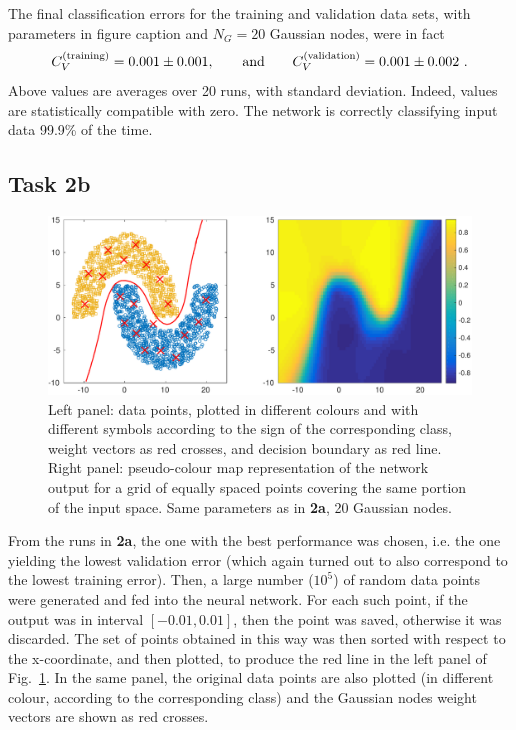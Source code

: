 \documentclass[12pt,titlepage]{article}
\begin{document}
The final classification errors for the training and validation data sets, with parameters in figure caption and $N_G = 20$ Gaussian nodes, were in fact
\[
C_V^{(\textup{training})} = 0.001 \pm 0.001 , \qquad \mbox{and} \qquad C_V^{(\textup{validation})} = 0.001 \pm 0.002 \ .
\]
Above values are averages over 20 runs, with standard deviation. Indeed, values are statistically compatible with zero. The network is correctly classifying input data 99.9\% of the time.


\clearpage
\subsection*{Task 2b}

\begin{figure}[htbp]
\centering
\includegraphics[width=\textwidth]{2b_boundary.pdf}
\caption{Left panel: data points, plotted in different colours and with different symbols according to the sign of the corresponding class, weight vectors as red crosses, and decision boundary as red line. Right panel: pseudo-colour map representation of the network output for a grid of equally spaced points covering the same portion of the input space. Same parameters as in \textbf{2a}, 20 Gaussian nodes.}
\label{fig:2b_boundary}
\end{figure}

From the runs in \textbf{2a}, the one with the best performance was chosen, i.e. the one yielding the lowest validation error (which again turned out to also correspond to the lowest training error).
Then, a large number ($10^5$) of random data points were generated and fed into the neural network. For each such point, if the output was in interval $[-0.01, 0.01]$, then the point was saved, otherwise it was discarded. The set of points obtained in this way was then sorted with respect to the x-coordinate, and then plotted, to produce the red line in the left panel of Fig.~\ref{fig:2b_boundary}. In the same panel, the original data points are also plotted (in different colour, according to the corresponding class) and the Gaussian nodes weight vectors are shown as red crosses. 
\end{document}
